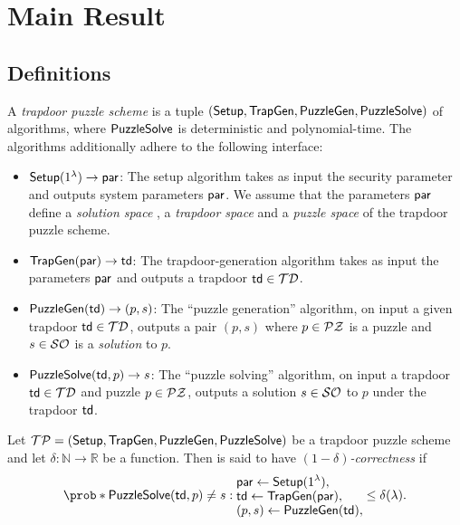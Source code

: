 
\section{Main Result}

\subsection{Definitions}

\begin{definition}
  A \emph{trapdoor puzzle scheme} is a tuple
  \((\mathsf{Setup},\allowbreak \mathsf{TrapGen},\allowbreak \mathsf{PuzzleGen},\allowbreak \mathsf{PuzzleSolve})\)
  of algorithms, where \(\mathsf{PuzzleSolve}\) is deterministic and polynomial-time.
  The algorithms additionally adhere to the following interface:
  \begin{itemize}[label={\textbullet},itemsep=0.1cm]
    \item \(\mathsf{Setup}(1^{\lambda}) \to \mathsf{par}\): The setup algorithm takes
          as input the security parameter and outputs system parameters \(\mathsf{par}\).
          We assume that the parameters \(\mathsf{par}\)
          define a \emph{solution space} \SO, a \emph{trapdoor space} \TD
          and a \emph{puzzle space} \PZ of the trapdoor puzzle scheme.
    \item \(\mathsf{TrapGen}(\mathsf{par}) \to \mathsf{td}\): The trapdoor-generation algorithm
          takes as input the parameters \(\mathsf{par}\) and outputs a trapdoor \(\mathsf{td} \in \mathcal{TD}\).
    \item \(\mathsf{PuzzleGen}(\mathsf{td}) \to (p,s)\): The ``puzzle generation'' algorithm,
          on input a given trapdoor \(\mathsf{td} \in \mathcal{TD}\),
          outputs a pair \((p,s)\) where \(p \in \mathcal{PZ}\) is a puzzle and \(s \in \mathcal{SO}\)
          is a \emph{solution} to \(p\).
    \item \(\mathsf{PuzzleSolve}(\mathsf{td},p) \to s\): The ``puzzle solving'' algorithm,
          on input a trapdoor \(\mathsf{td} \in \mathcal{TD}\) and puzzle \(p \in \mathcal{PZ}\),
          outputs a solution \(s \in \mathcal{SO}\) to \(p\) under the trapdoor \(\mathsf{td}\).
  \end{itemize}
\end{definition}

\begin{definition}\label{def:corr}
  Let \(\mathcal{TP} = (\mathsf{Setup},\allowbreak \mathsf{TrapGen},\allowbreak \mathsf{PuzzleGen},
  \allowbreak \mathsf{PuzzleSolve})\) be a trapdoor puzzle scheme
  and let \(\delta : \mathbb{N} \to \mathbb{R}\) be a function.
  Then \TP is said to have \emph{\((1-\delta)\)-correctness} if
  \begin{equation}
    \prob*{
      \PuzzleSolve(\td,p) \ne s
      : \begin{subarray}{l}
        \displaystyle \params \assign \Setup(1^{\lambda}),\\
        \displaystyle \td \assign \TrapGen(\params),\\
        \displaystyle (p,s) \assign \PuzzleGen(\td),
        \end{subarray}
    }
    \le \delta(\lambda).
  \end{equation}
\end{definition}

